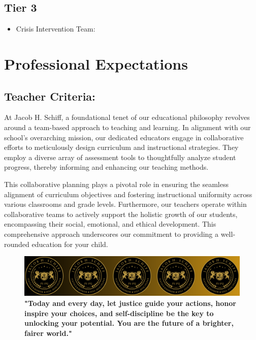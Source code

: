 \documentclass[11pt, letterpaper]{article}
\begin{document}
\subsection{Tier 3}
\begin{itemize}
\item Crisis Intervention Team:
\end{itemize}

\section{Professional Expectations}
\subsection{Teacher Criteria:}
At Jacob H. Schiff, a foundational tenet of our educational philosophy revolves around a team-based approach to teaching and learning. In alignment with our school's overarching mission, our dedicated educators engage in collaborative efforts to meticulously design curriculum and instructional strategies. They employ a diverse array of assessment tools to thoughtfully analyze student progress, thereby informing and enhancing our teaching methods.

This collaborative planning plays a pivotal role in ensuring the seamless alignment of curriculum objectives and fostering instructional uniformity across various classrooms and grade levels. Furthermore, our teachers operate within collaborative teams to actively support the holistic growth of our students, encompassing their social, emotional, and ethical development. This comprehensive approach underscores our commitment to providing a well-rounded education for your child.

\begin{figure}[H]
  \centering
\includegraphics[width=1\linewidth]{4.png}
\caption{\textbf{"Today and every day, let justice guide your actions, honor inspire your choices, and self-discipline be the key to unlocking your potential. You are the future of a brighter, fairer world."}}
  \label{fig:school symbol}
\end{figure}
\end{document}
